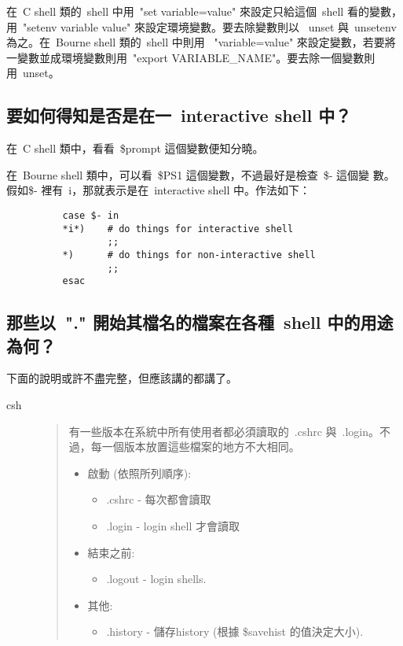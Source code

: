 \documentclass{article}
\begin{document}
\begin{CJK*}{Bg5}{ming}
	在~C shell 類的~shell 中用~"set variable=value" 來設定只給這個~shell 
        看的變數，用~"setenv variable value" 來設定環境變數。要去除變數則以 
       ~unset 與~unsetenv 為之。在~Bourne shell 類的~shell 中則用 
       ~"variable=value" 來設定變數，若要將一變數並成環境變數則用~"export 
       VARIABLE\_NAME"。要去除一個變數則用~unset。 

\subsection{要如何得知是否是在一~interactive shell 中？}

	在~C shell 類中，看看~\$prompt 這個變數便知分曉。

	在~Bourne shell 類中，可以看~\$PS1 這個變數，不過最好是檢查~\$- 這個變
	數。假如\$- 裡有~i，那就表示是在~interactive shell 中。作法如下：
\begin{verbatim}
          case $- in
          *i*)    # do things for interactive shell
                  ;;
          *)      # do things for non-interactive shell
                  ;;
          esac
\end{verbatim}
\subsection{那些以~"." 開始其檔名的檔案在各種~shell 中的用途為何？}
     下面的說明或許不盡完整，但應該講的都講了。
\begin{description}
      \item[csh]
\begin{quote}
	有一些版本在系統中所有使用者都必須讀取的~.cshrc 與~.login。不
	過，每一個版本放置這些檔案的地方不大相同。
	\begin{itemize}
        \item  啟動 (依照所列順序):
	  \begin{itemize}
          \item   .cshrc   - 每次都會讀取
          \item   .login   - login shell 才會讀取
	  \end{itemize}

        \item  結束之前:
	  \begin{itemize}
            \item   .logout  - login shells.
	  \end{itemize}

        \item  其他:
	  \begin{itemize}
             \item  .history - 儲存history (根據 \$savehist 的值決定大小).
	  \end{itemize}
	\end{itemize}
\end{quote}


\end{description}
\end{CJK*}
\end{document}
